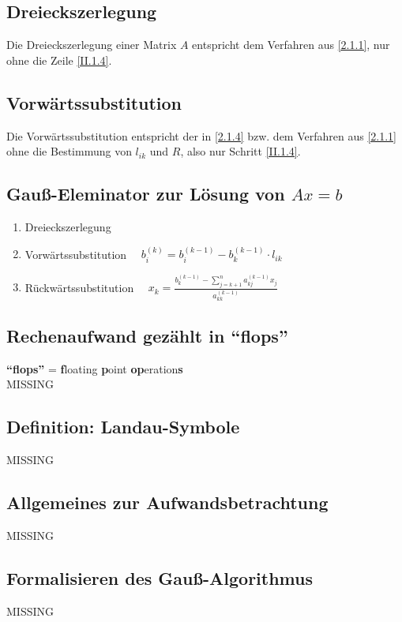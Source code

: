 \documentclass[ngerman,fontsize=11pt, paper=a4, parskip=false, titlepage=false, toc=bib]{scrbook}
\begin{document}
\subsection{Dreieckszerlegung} \label{2.1.5} 
Die Dreieckszerlegung einer Matrix $A$ entspricht dem Verfahren aus \ref{2.1.1}, nur ohne die Zeile \eqref{II.1.4}.

\subsection{Vorwärtssubstitution} 
Die Vorwärtssubstitution entspricht der in \ref{2.1.4} bzw. dem Verfahren aus \ref{2.1.1} ohne die Bestimmung von $l_{ik}$ und $R$, also nur Schritt \ref{II.1.4}.

\subsection{Gauß-Eleminator zur Lösung von $Ax=b$}
\begin{enumerate}[1]
	\item Dreieckszerlegung
	\item Vorwärtssubstitution        $\quad b_i^{(k)} = b_i^{(k-1)} -b_k^{(k-1)} \cdot   l_{ik} $
	\item Rückwärtssubstitution      $\quad x_k = \frac{b_k^{(k-1)}-\sum_{j=k+1}^{n}a_{kj}^{(k-1)}x_j}{a_{kk}^{(k-1)}}$
\end{enumerate}

\subsection{Rechenaufwand gezählt in \enquote{flops}} 
\textbf{\enquote{flops} }= \textbf{f}loating \textbf{p}oint \textbf{op}eration\textbf{s} \\
MISSING

\subsection{Definition: Landau-Symbole} 
MISSING

\subsection{Allgemeines zur Aufwandsbetrachtung}
MISSING

\subsection{Formalisieren des Gauß-Algorithmus}  
MISSING
\end{document}
